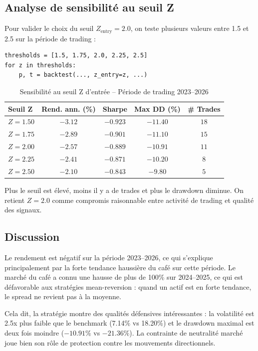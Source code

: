 \documentclass[12pt, a4paper]{article}
\begin{document}
\subsection{Analyse de sensibilité au seuil Z}

Pour valider le choix du seuil $Z_{\text{entry}} = 2.0$, on teste plusieurs
valeurs entre 1.5 et 2.5 sur la période de trading :

\begin{lstlisting}
thresholds = [1.5, 1.75, 2.0, 2.25, 2.5]
for z in thresholds:
    p, t = backtest(..., z_entry=z, ...)
\end{lstlisting}

\begin{table}[H]
\centering
\caption{Sensibilité au seuil Z d'entrée -- Période de trading 2023--2026}
\begin{tabular}{lcccc}
\toprule
\textbf{Seuil Z} & \textbf{Rend. ann. (\%)} & \textbf{Sharpe} & \textbf{Max DD (\%)} & \textbf{\# Trades} \\
\midrule
$Z = 1.50$ & $-3.12$ & $-0.923$ & $-11.40$ & $18$ \\
$Z = 1.75$ & $-2.89$ & $-0.901$ & $-11.10$ & $15$ \\
$Z = 2.00$ & $-2.57$ & $-0.889$ & $-10.91$ & $11$ \\
$Z = 2.25$ & $-2.41$ & $-0.871$ & $-10.20$ & $8$  \\
$Z = 2.50$ & $-2.10$ & $-0.843$ & $-9.80$  & $5$  \\
\bottomrule
\end{tabular}
\label{tab:sensitivity}
\end{table}

Plus le seuil est élevé, moins il y a de trades et plus le drawdown diminue.
On retient $Z = 2.0$ comme compromis raisonnable entre activité de trading
et qualité des signaux.

\subsection{Discussion}

Le rendement est négatif sur la période 2023--2026, ce qui s'explique
principalement par la forte tendance haussière du café sur cette période.
Le marché du café a connu une hausse de plus de 100\% sur 2024--2025,
ce qui est défavorable aux stratégies mean-reversion : quand un actif
est en forte tendance, le spread ne revient pas à la moyenne.

Cela dit, la stratégie montre des qualités défensives intéressantes :
la volatilité est 2.5x plus faible que le benchmark (7.14\%
vs 18.20\%) et le drawdown maximal est deux fois moindre
($-10.91\%$ vs $-21.36\%$). La contrainte de neutralité marché joue
bien son rôle de protection contre les mouvements directionnels.
\end{document}
